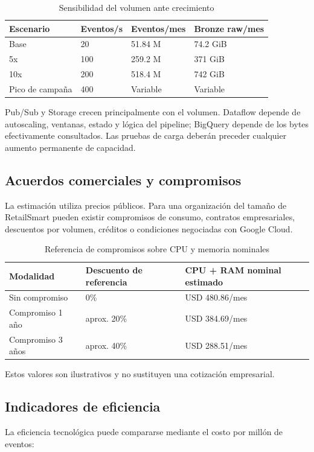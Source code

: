 \documentclass[11pt,a4paper]{article}
\begin{document}
\begin{table}[H]
\caption{Sensibilidad del volumen ante crecimiento}\label{tab:sensibilidad-costos}
\small
\begin{tabularx}{\linewidth}{@{}P{.28\linewidth}P{.18\linewidth}P{.25\linewidth}Y@{}}\toprule
Escenario & Eventos/s & Eventos/mes & Bronze raw/mes\\\midrule
Base & 20 & 51.84 M & 74.2 GiB\\
5x & 100 & 259.2 M & 371 GiB\\
10x & 200 & 518.4 M & 742 GiB\\
Pico de campaña & 400 & Variable & Variable\\\bottomrule
\end{tabularx}
\end{table}

Pub/Sub y Storage crecen principalmente con el volumen. Dataflow depende de autoscaling, ventanas, estado y lógica del pipeline; BigQuery depende de los bytes efectivamente consultados. Las pruebas de carga deberán preceder cualquier aumento permanente de capacidad.

\subsection{Acuerdos comerciales y compromisos}
La estimación utiliza precios públicos. Para una organización del tamaño de RetailSmart pueden existir compromisos de consumo, contratos empresariales, descuentos por volumen, créditos o condiciones negociadas con Google Cloud.

\begin{table}[H]
\caption{Referencia de compromisos sobre CPU y memoria nominales}\label{tab:descuentos-costos}
\small
\begin{tabularx}{\linewidth}{@{}P{.35\linewidth}P{.25\linewidth}Y@{}}\toprule
Modalidad & Descuento de referencia & CPU + RAM nominal estimado\\\midrule
Sin compromiso & 0\% & USD 480.86/mes\\
Compromiso 1 año & aprox. 20\% & USD 384.69/mes\\
Compromiso 3 años & aprox. 40\% & USD 288.51/mes\\\bottomrule
\end{tabularx}
\end{table}

Estos valores son ilustrativos y no sustituyen una cotización empresarial.

\subsection{Indicadores de eficiencia}
La eficiencia tecnológica puede compararse mediante el costo por millón de eventos:
\end{document}
